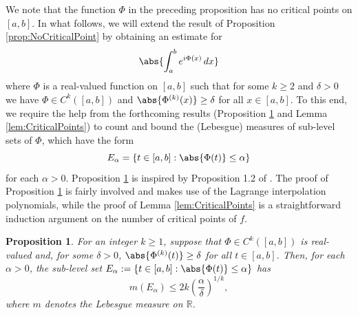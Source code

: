 \documentclass[11pt, letter]{book}
\newtheorem{proposition}[theorem]{Proposition}
\newcommand{\lp}{\left(}
\newcommand{\rp}{\right)}
\newcommand{\f}[2]{\frac{#1}{#2}}
\newcommand{\al}{\alpha}
\begin{document}
\noindent We note that the function $\Phi$ in the preceding proposition has no critical points on $[a,b]$. In what follows, we will extend the result of Proposition \ref{prop:NoCriticalPoint} by obtaining an estimate for 
\begin{equation*}
    \abs{\int^b_a e^{i \Phi(x)}\,dx}
\end{equation*}
where $\Phi$ is a real-valued function on $[a,b]$ such that for some $k\geq 2$ and $\delta > 0$ we have $\Phi \in C^k([a,b])$ and $\abs{\Phi^{(k)}(x)} \geq \delta$ for all $x\in [a,b]$. To this end, we require the help from the forthcoming results (Proposition \ref{prop:SublevelSetEstimate} and Lemma \ref{lem:CriticalPoints}) to count and bound the (Lebesgue) measures of sub-level sets of $\Phi$, which have the form
\begin{equation*}
    E_\al = \{ t\in [a,b] : \abs{\Phi(t)} \leq \al\}
\end{equation*}
for each $\al > 0$. Proposition \ref{prop:SublevelSetEstimate} is inspired by Proposition 1.2 of \cite{phd_thesis}. The proof of Proposition \ref{prop:SublevelSetEstimate} is fairly involved and makes use of the Lagrange interpolation polynomials, while the proof of Lemma \ref{lem:CriticalPoints} is a straightforward induction argument on the number of critical points of $f$. 

\begin{framed}
\begin{proposition}\label{prop:SublevelSetEstimate} 
For an integer $k\geq 1$, suppose that $\Phi\in C^k([a,b])$ is real-valued and, for some $\delta>0$, $\abs{\Phi^{(k)}(t)} \geq \delta$ for all $t \in [a,b]$. Then, for each $\alpha>0$, the sub-level set $E_\al := \{ t \in[a,b] : \abs{\Phi(t)} \leq \al \}$ has
\begin{equation*}
    m(E_\al) \leq 2 k \lp \f{\al}{\delta} \rp^{1/k},
\end{equation*}
where $m$ denotes the Lebesgue measure on $\mathbb{R}$.
\end{proposition}
\end{framed}
\end{document}

